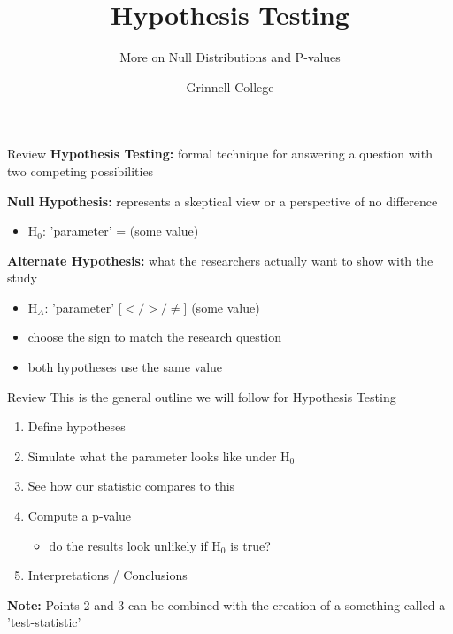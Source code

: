 \documentclass{beamer}
\title[Introduction to Statistics]{Hypothesis Testing}
\subtitle{More on Null Distributions and P-values}
\author{Grinnell College}
\date{}
\begin{document}
\begin{frame}
  \titlepage
\end{frame}

\begin{frame}{Review}
\textbf{Hypothesis Testing:} formal technique for answering a question with two competing possibilities \vspace{6mm}

\textbf{Null Hypothesis:} represents a skeptical view or a perspective of no difference
\begin{itemize}
    \item H$_0$: 'parameter' = (some value)
\end{itemize}\vspace{6mm}

\textbf{Alternate Hypothesis:} what the researchers actually want to show with the study
\begin{itemize}
    \item H$_A$: 'parameter'  [$</>/\neq$]  (some value)
    \item choose the sign to match the research question
    \item both hypotheses use the same value
\end{itemize}
\end{frame}

\begin{frame}{Review}
This is the general outline we will follow for Hypothesis Testing \vspace{1mm}
\begin{enumerate}
    \item Define hypotheses
    \item Simulate what the parameter looks like under H$_0$
    \item See how our statistic compares to this
    \item Compute a p-value
    \begin{itemize}
        \item do the results look unlikely if H$_0$ is true?
    \end{itemize}
    \item Interpretations / Conclusions
\end{enumerate} \vspace{12mm}

\textbf{Note:} Points 2 and 3 can be combined with the creation of a something called a 'test-statistic'
\end{frame}
\end{document}
